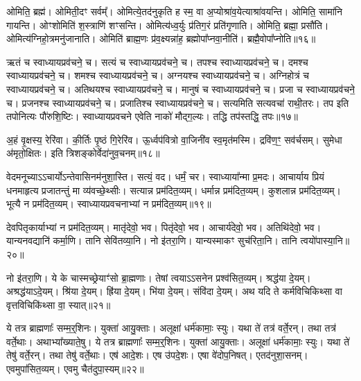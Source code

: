 ओमिति॒ ब्रह्म॑। 
ओमिती॒दꣳ सर्वम्᳚। 
ओमित्ये॒तद॑नुकृति ह स्म॒ वा अ॒प्योश्रा॑व॒येत्या\-श्रा॑व\-यन्ति। 
ओमिति॒ सामा॑नि गायन्ति। 
ओꣳ\-शोमिति॑ श॒स्त्राणि॑ शꣳसन्ति। 
ओमित्य॑ध्व॒र्युः प्र॑तिग॒रं प्रति॑\-गृणाति। 
ओमिति॒ ब्रह्मा॒ प्रसौ॑ति। 
ओमित्य॑ग्निहो॒त्रमनु॑जानाति। 
ओमिति॑ ब्राह्म॒णः प्र॑व॒क्ष्यन्ना॑ह॒ ब्रह्मोपा᳚प्नवा॒नीति॑। 
ब्रह्मै॒वो\-पा᳚प्नोति॥१६॥%
\anuvakamend[ओन्दश॑]

ऋतं च स्वाध्याय\-प्रव॑चने॒ च। 
सत्यं च स्वाध्याय\-प्रव॑चने॒ च। 
तपश्च स्वाध्याय\-प्रव॑चने॒ च। 
दमश्च स्वाध्याय\-प्रव॑चने॒ च। 
शमश्च स्वाध्याय\-प्रव॑चने॒ च। 
अग्नयश्च स्वाध्याय\-प्रव॑चने॒ च। 
अग्निहोत्रं च स्वाध्याय\-प्रव॑चने॒ च। 
अतिथयश्च स्वाध्याय\-प्रव॑चने॒ च। 
मानुषं च स्वाध्याय\-प्रव॑चने॒ च। 
प्रजा च स्वाध्याय\-प्रव॑चने॒ च। 
प्रजनश्च स्वाध्याय\-प्रव॑चने॒ च। 
प्रजातिश्च स्वाध्याय\-प्रव॑चने॒ च। 
सत्यमिति सत्य\-वचा॑ राथी॒तरः। 
तप इति तपो\-नित्यः पौ॑रुशि॒ष्टिः। 
स्वाध्याय\-प्रवचने एवेति नाको॑ मौद्ग॒ल्यः। 
तद्धि तप॑स्तद्धि॒ तपः॥१७॥
\anuvakamend[प्रजा च स्वाध्याय\-प्रव॑चने॒ च षट्च॑]

अ॒हं वृ॒क्षस्य॒ रेरि॑वा। 
की॒र्तिः पृ॒ष्ठं गि॒रेरि॑व। 
ऊ॒र्ध्वप॑वित्रो वा॒जिनी॑व स्व॒मृत॑मस्मि। 
द्रवि॑ण॒ꣳ॒ सव॑र्चसम्। 
सुमेधा अ॑मृतो॒क्षितः। 
इति त्रिशङ्कोर्वेदा॑नुव॒चनम्॥१८॥
\anuvakamend[अ॒हꣳ षट्]

वेदमनूच्याऽऽचार्योऽन्तेवासिनम॑नुशा॒स्ति। 
सत्यं॒ वद। 
धर्मं॒ चर। 
स्वाध्याया᳚न्मा प्र॒मदः। 
आचार्याय प्रियं धनमाहृत्य प्रजातन्तुं मा व्य॑वच्छे॒थ्सीः। 
सत्यान्न प्रम॑दित॒व्यम्। 
धर्मान्न प्रम॑दित॒व्यम्। 
कुशलान्न प्रम॑दित॒व्यम्। 
भूत्यै न प्रम॑दित॒व्यम्। 
स्वाध्याय\-प्रवचनाभ्यां न प्रम॑दित॒व्यम्॥१९॥

देवपितृकार्याभ्यां न प्रम॑दित॒व्यम्। 
मातृ॑देवो॒ भव। 
पितृ॑देवो॒ भव। 
आचार्य॑देवो॒ भव। 
अतिथि॑देवो॒ भव। 
यान्यनवद्यानि॑ कर्मा॒णि। 
तानि सेवि॑तव्या॒नि। 
नो इ॑तरा॒णि। 
यान्यस्माकꣳ सुच॑रिता॒नि। 
तानि त्वयो॑पास्या॒नि॥२०॥

नो इ॑तरा॒णि। 
ये के चास्मच्छ्रेयाꣳ॑सो ब्रा॒ह्मणाः। 
तेषां त्वयाऽऽसनेन प्रश्व॑सित॒व्यम्। 
श्रद्ध॑या दे॒यम्। 
अश्रद्ध॑याऽदे॒यम्। 
श्रि॑या दे॒यम्। 
ह्रि॑या दे॒यम्। 
भि॑या दे॒यम्। 
संवि॑दा दे॒यम्। 
अथ यदि ते कर्मविचिकिथ्सा वा वृत्तविचिकि॑थ्सा वा॒ स्यात्॥२१॥

ये तत्र ब्राह्मणाः᳚ सम्म॒र्॒\mbox{}शिनः। 
युक्ता॑ आयु॒क्ताः। 
अलूक्षा॑ धर्म॑कामाः॒ स्युः। 
यथा ते॑ तत्र॑ वर्ते॒रन्। 
तथा तत्र॑ वर्ते॒थाः। 
अथाभ्या᳚ख्याते॒षु। 
ये तत्र ब्राह्मणाः᳚ सम्म॒र्॒\mbox{}शिनः। 
युक्ता॑ आयु॒क्ताः। 
अलूक्षा॑ धर्म॑कामाः॒ स्युः। 
यथा ते॑ तेषु॑ वर्ते॒रन्। 
तथा तेषु॑ वर्ते॒थाः। 
एष॑ आदे॒शः। 
एष उ॑पदे॒शः। 
एषा वे॑दोप॒निषत्। 
एतद॑नुशा॒सनम्। 
एवमुपा॑सित॒व्यम्। 
एवमु चैत॑दुपा॒स्यम्॥२२॥
\anuvakamend[स्वाध्यायप्रवचनाभ्यान्न प्रम॑दित॒व्यं तानि त्वयो॑पास्या॒नि स्यात्तेषु॑ वर्ते॒रन्थ्स॒प्त च॑]

